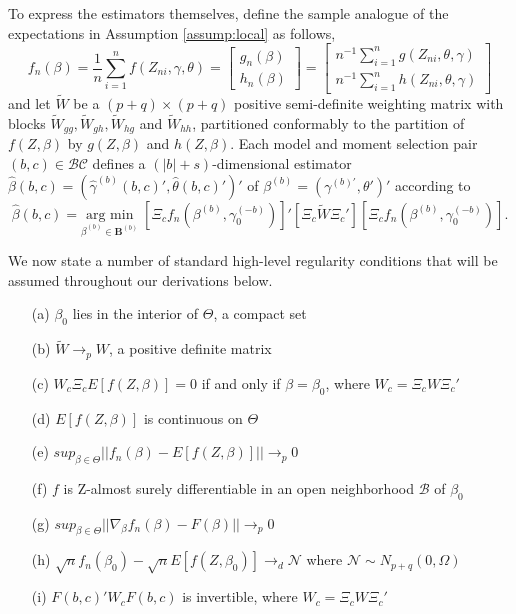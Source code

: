 To express the estimators themselves, define the sample analogue of the expectations in Assumption \ref{assump:local} as follows,
\begin{equation}
	f_n(\beta) = \frac{1}{n}\sum_{i=1}^n f(Z_{ni}, \gamma, \theta) = \left[\begin{array}{c}g_n(\beta)\\ h_n(\beta) \end{array} \right] = \left[\begin{array}{c} n^{-1}\sum_{i=1}^n g(Z_{ni}, \theta, \gamma)\\n^{-1}\sum_{i=1}^n h(Z_{ni}, \theta, \gamma) \end{array}\right]
\end{equation}
and let $\widetilde{W}$ be a $(p+q)\times(p+q)$ positive semi-definite weighting matrix with blocks $\widetilde{W}_{gg}, \widetilde{W}_{gh}, \widetilde{W}_{hg}$ and $\widetilde{W}_{hh}$, partitioned conformably to the partition of $f(Z,\beta)$ by $g(Z,\beta)$ and $h(Z,\beta)$. 
Each model and moment selection pair $(b,c)\in \mathcal{BC}$ defines a $(|b|+s)$-dimensional estimator $\widehat{\beta}(b,c)=( \widehat{\gamma}^{(b)}(b,c)',\widehat{\theta}(b,c)')'$ of $\beta^{(b)}= \left(\gamma^{(b)'}, \theta'  \right)'$ according to
	\begin{equation}
    \widehat{\beta}(b,c) = \underset{\beta^{(b)}\in \mathbf{B}^{(b)}} {\mbox{arg min}}\;\left[\Xi_c f_n\left(\beta^{(b)}, \gamma_0^{(-b)}\right)\right]'\left[\Xi_c \widetilde{W}\Xi_c' \right]\left[\Xi_c f_n\left(\beta^{(b)}, \gamma_0^{(-b)}\right)\right].
	\end{equation}


We now state a number of standard high-level regularity conditions that will be assumed throughout our derivations below.

\begin{assump}
  \label{assump:high-level}
    \mbox{}
\begin{itemize}
\item[(a)] $\beta_0$ lies in the interior of $\Theta$, a compact set
\item[(b)] $\widetilde{W} \rightarrow_{p} W$, a positive definite matrix
\item[(c)] $W_c \Xi_c E[f(Z, \beta)] = 0$ if and only if $\beta = \beta_0$, where $W_c = \Xi_c W \Xi_c'$
\item[(d)] $E[f(Z,\beta)]$ is continuous on $\Theta$
\item[(e)] $sup_{\beta\in \Theta} ||f_n(\beta) - E[f(Z,\beta)]||\rightarrow_p 0$
\item[(f)] $f$ is Z-almost surely differentiable in an open neighborhood $\mathcal{B}$ of $\beta_0$
\item[(g)] $sup_{\beta \in \Theta} ||\nabla_{\beta} f_n(\beta) - F(\beta)|| \rightarrow_p 0 $
\item[(h)] $\sqrt{n}f_n(\beta_0) - \sqrt{n}E[f(Z,\beta_0)] \rightarrow_d \mathscr{N}$ where $\mathscr{N} \sim N_{p+q}(0,\Omega)$
\item[(i)] $F(b,c)' W_c F(b,c)$ is invertible, where $W_c = \Xi_c W \Xi_c'$
\end{itemize}
\end{assump}

